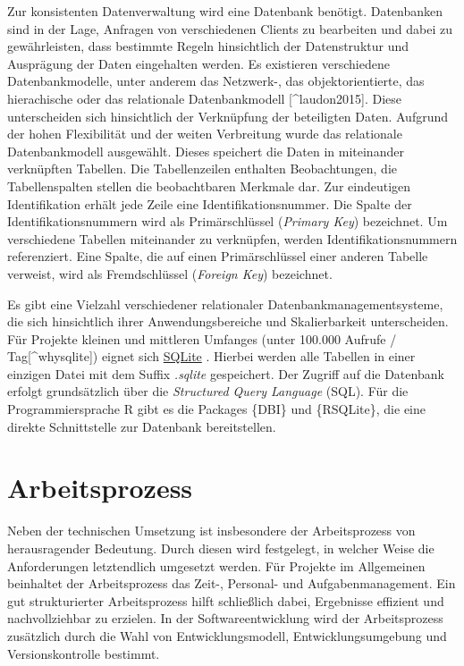 \documentclass[
]{article}
\begin{document}
Zur konsistenten Datenverwaltung wird eine Datenbank benötigt. Datenbanken sind in der Lage, Anfragen von verschiedenen Clients zu bearbeiten und dabei zu gewährleisten, dass bestimmte Regeln hinsichtlich der Datenstruktur und Ausprägung der Daten eingehalten werden. Es existieren verschiedene Datenbankmodelle, unter anderem das Netzwerk-, das objektorientierte, das hierachische oder das relationale Datenbankmodell {[}\^{}laudon2015{]}. Diese unterscheiden sich hinsichtlich der Verknüpfung der beteiligten Daten. Aufgrund der hohen Flexibilität und der weiten Verbreitung wurde das relationale Datenbankmodell ausgewählt. Dieses speichert die Daten in miteinander verknüpften Tabellen. Die Tabellenzeilen enthalten Beobachtungen, die Tabellenspalten stellen die beobachtbaren Merkmale dar. Zur eindeutigen Identifikation erhält jede Zeile eine Identifikationsnummer. Die Spalte der Identifikationsnummern wird als Primärschlüssel (\emph{Primary Key}) bezeichnet. Um verschiedene Tabellen miteinander zu verknüpfen, werden Identifikationsnummern referenziert. Eine Spalte, die auf einen Primärschlüssel einer anderen Tabelle verweist, wird als Fremdschlüssel (\emph{Foreign Key}) bezeichnet.

Es gibt eine Vielzahl verschiedener relationaler Datenbankmanagementsysteme, die sich hinsichtlich ihrer Anwendungsbereiche und Skalierbarkeit unterscheiden. Für Projekte kleinen und mittleren Umfanges (unter 100.000 Aufrufe / Tag{[}\^{}whysqlite{]}) eignet sich \href{https://www.sqlite.org/index.html}{SQLite} \autocite{laudon2015}. Hierbei werden alle Tabellen in einer einzigen Datei mit dem Suffix \emph{.sqlite} gespeichert. Der Zugriff auf die Datenbank erfolgt grundsätzlich über die \emph{Structured Query Language} (SQL). Für die Programmiersprache R gibt es die Packages \{DBI\} und \{RSQLite\}, die eine direkte Schnittstelle zur Datenbank bereitstellen.

\hypertarget{workflow}{%
\section{Arbeitsprozess}\label{workflow}}

Neben der technischen Umsetzung ist insbesondere der Arbeitsprozess von herausragender Bedeutung. Durch diesen wird festgelegt, in welcher Weise die Anforderungen letztendlich umgesetzt werden. Für Projekte im Allgemeinen beinhaltet der Arbeitsprozess das Zeit-, Personal- und Aufgabenmanagement. Ein gut strukturierter Arbeitsprozess hilft schließlich dabei, Ergebnisse effizient und nachvollziehbar zu erzielen. In der Softwareentwicklung wird der Arbeitsprozess zusätzlich durch die Wahl von Entwicklungsmodell, Entwicklungsumgebung und Versionskontrolle bestimmt.
\end{document}
